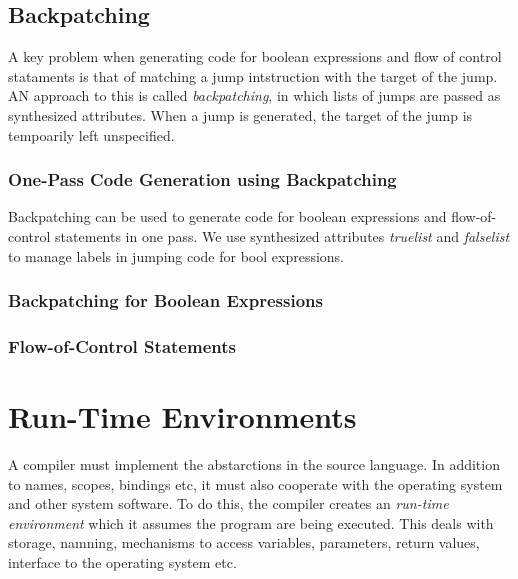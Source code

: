 \documentclass{article}
\begin{document}

\subsection{Backpatching} %
\label{sub:Backpatching}
A key problem when generating code for boolean expressions and flow of control stataments is that of matching a jump intstruction with the target of the jump. AN approach to this is called \emph{backpatching}, in which lists of jumps are passed as synthesized attributes. When a jump is generated, the target of the jump is tempoarily left unspecified.

\subsubsection{One-Pass Code Generation using Backpatching} %
\label{ssub:One-Pass Code Generation using Backpatching}
Backpatching can be used to generate code for boolean expressions and flow-of-control statements in one pass. We use synthesized attributes \emph{truelist} and \emph{falselist} to manage labels in jumping code for bool expressions.

\subsubsection{Backpatching for Boolean Expressions} %
\label{ssub:Backpatching for Boolean Expressions}


\subsubsection{Flow-of-Control Statements} %
\label{ssub:Flow-of-Control Statements}




\section{Run-Time Environments} %
\label{sec:Run-Time Environments}
A compiler must implement the abstarctions in the source language. In addition to names, scopes, bindings etc, it must also cooperate with the operating system and other system software. To do this, the compiler creates an \emph{run-time environment} which it assumes the program are being executed. This deals with storage, namning, mechanisms to access variables, parameters, return values, interface to the operating system etc.
\end{document}
